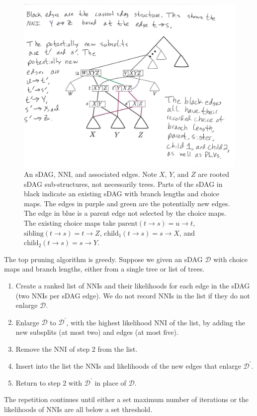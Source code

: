 \documentclass{article}
\begin{document}
\begin{figure}[!th]\centering
\includegraphics[scale=0.4]{figures/top_pruning_nni_labels.pdf}
\vspace{-3ex}
\caption{An sDAG, NNI, and associated edges. Note $X$, $Y$, and $Z$ are rooted sDAG sub-structures, not necessarily trees.
Parts of the sDAG in black indicate an existing sDAG with branch lengths and choice maps.
The edges in purple and green are the potentially new edges. The edge in blue is a parent edge not selected by the choice maps.
The existing choice maps take $\text{parent}(t\rightarrow s) = u\rightarrow t$, $\text{sibling}(t\rightarrow s) = t\rightarrow Z$, $\text{child}_1(t\rightarrow s) = s\rightarrow X$, and $\text{child}_2(t\rightarrow s) = s\rightarrow Y$.}
\label{fig:topPruningChoices}
\end{figure}

The top pruning algorithm is greedy. Suppose we given an sDAG $\mathcal{D}$ with choice maps and branch lengths, either from a single tree or list of trees.
\begin{enumerate}
\item Create a ranked list of NNIs and their likelihoods for each edge in the sDAG (two NNIs per sDAG edge). 
We do not record NNIs in the list if they do not enlarge $\mathcal{D}$.
\item Enlarge $\mathcal{D}$ to $\mathcal{D}^\prime$, with the highest likelihood NNI of the list, by adding
the new subsplits (at most two) and edges (at most five).
\item Remove the NNI of step 2 from the list. 
\item Insert into the list the NNIs and likelihoods of the new edges that enlarge $\mathcal{D}^\prime$.
\item Return to step 2 with $\mathcal{D}^\prime$ in place of $\mathcal{D}$.
\end{enumerate}
The repetition continues until either a set maximum number of iterations or the likelihoods of NNIs are all below a set threshold.
\end{document}
